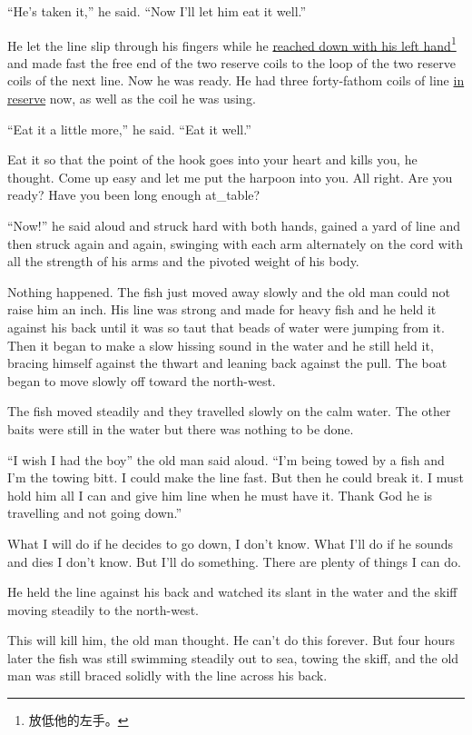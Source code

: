 \documentclass[fontset=ubuntu]{ctexrep}
\begin{document}
``He's taken it,'' he said. ``Now I'll let him eat it well.''

He let the line slip through his fingers while he \uline{reached down with
  his left hand}\footnote{放低他的左手。} and made fast the free end of the
two reserve coils to the loop of the two reserve coils of the next line. Now
he was ready. He had three forty-fathom coils of line \uline{in reserve} now,
as well as the coil he was using.

``Eat it a little more,'' he said. ``Eat it well.''

Eat it so that the point of the hook goes into your heart and kills you, he
thought. Come up easy and let me put the harpoon into you. All right. Are
you ready? Have you been long enough \gls{at_table}?

``Now!'' he said aloud and struck hard with both hands, \gls{gained} a yard
of line and then struck again and again, \gls{swinging} with each arm
\gls{alternately} on the cord with all the strength of his arms and the
\gls{pivoted} weight of his body.

Nothing happened. The fish just moved away slowly and the old man could not
raise him an \gls{inch}. His line was strong and made for heavy fish and he
held it against his back until it was so taut that \glspl{bead} of
water were jumping from it. Then it began to make a slow hissing sound in
the water and he still held it, \gls{bracing} himself against the thwart and
leaning back against the pull. The boat began to move slowly off toward the
north-west.

The fish moved steadily and they travelled slowly on the \gls{calm} water. The
other baits were still in the water but there was nothing to be done.

``I wish I had the boy'' the old man said aloud. ``I'm being \gls{towed} by
a fish and I'm the towing \gls{bitt}. I could make the line fast. But then
he could break it. I must hold him all I can and give him line when he must
have it. Thank God he is travelling and not going down.''

What I will do if he decides to go down, I don't know. What I'll do if he
sounds and dies I don't know. But I'll do something. There are \gls{plenty} of
things I can do.

He held the line against his back and watched its slant in the water and the
skiff moving steadily to the north-west.

This will kill him, the old man thought. He can't do this forever. But four
hours later the fish was still swimming steadily out to sea, towing the
skiff, and the old man was still \gls{braced} \gls{solidly} with the line
across his back.
\end{document}
